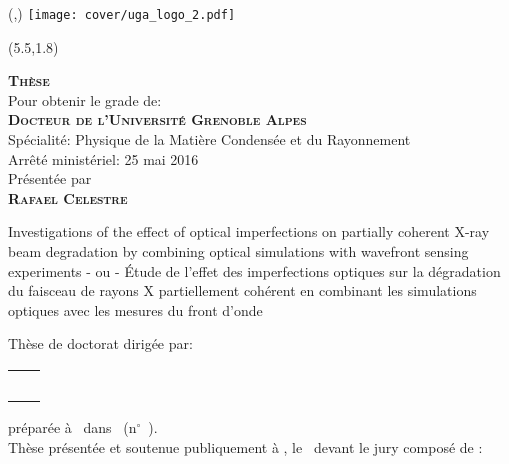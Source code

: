 \documentclass[a4paper, twoside]{report}
\newcommand{\thesisTitle}{Investigations of the effect of optical imperfections on partially coherent X-ray beam degradation by combining optical simulations with wavefront sensing experiments}
\newcommand{\thesisTitleFR}{\'Etude de l'effet des imperfections optiques sur la d\'egradation du faisceau de rayons X partiellement coh\'erent en combinant les simulations optiques avec les mesures du front d'onde}
\begin{document}
\begin{textblock}{1}(\hpos,\vpos)
	\texttt{[image: cover/uga\_logo\_2.pdf]}	
\end{textblock}


\begin{singlespace}
\begin{textblock}{10}(5.5,1.8)
	\color{black}

	\begin{flushleft}
	    \Large \textbf{\textsc{Thèse}}\\
	    \large Pour obtenir le grade de:\\ \bigskip \vfill  
	    \Large \textbf{\textsc{Docteur de l’Université Grenoble Alpes}} \\
        \large Spécialité: Physique de la Matière Condensée et du Rayonnement\\
        \small Arrêté ministériel: 25 mai 2016\\ \bigskip \vfill  
        \large Présentée par\\ \bigskip \vfill 
        \Large \textbf{\textsc{Rafael Celestre}}\\ \bigskip \vfill 
	\end{flushleft}
	\begin{center}
		\Large{\thesisTitle} \bigskip %
		\vfill
		\large{- ou -} \bigskip
		\vfill
		\Large{\thesisTitleFR} \bigskip %
		\vfill
	\end{center}
	\begin{flushleft}
		\normalsize Thèse de doctorat dirigée par: \\ \bigskip
		\small
		\begin{tabular}{@{} L{9.5cm} R{4.5cm}}
    		\jurynameE  \\ \juryadressE & \juryroleE \\
    		\jurynameF  \\ \juryadressF & \juryroleF  \\ \bigskip
	\end{tabular} 
		\normalsize préparée à \PhDworkingplace~dans \ecodoctitle~(n$^{\circ}$~\ecodocnum).\\ \bigskip
		\vfill
		Thèse présentée et soutenue publiquement à , le ~devant le jury composé de :
	\end{flushleft}
	\small


\end{textblock}
\end{singlespace}
\end{document}
